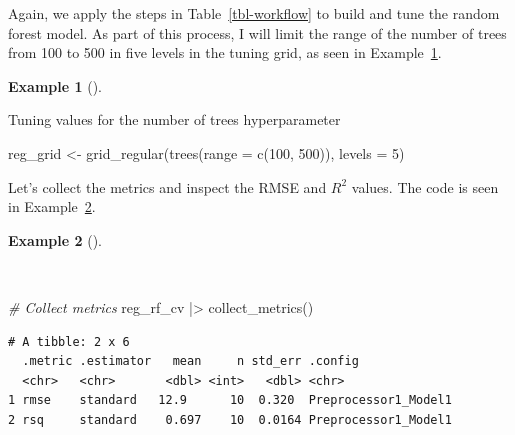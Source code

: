 \documentclass[
  letterpaper,
  krantz1]{latex/krantz-mod}
\newenvironment{Shaded}{\begin{snugshade}}{\end{snugshade}}
\newcommand{\AttributeTok}[1]{\textcolor[rgb]{0.00,0.00,0.00}{#1}}
\newcommand{\CommentTok}[1]{\textcolor[rgb]{0.00,0.00,0.00}{\textit{#1}}}
\newcommand{\DecValTok}[1]{\textcolor[rgb]{0.00,0.00,0.00}{#1}}
\newcommand{\FunctionTok}[1]{\textcolor[rgb]{0.00,0.00,0.00}{#1}}
\newcommand{\NormalTok}[1]{\textcolor[rgb]{0.00,0.00,0.00}{#1}}
\newcommand{\OtherTok}[1]{\textcolor[rgb]{0.00,0.00,0.00}{#1}}
\newcommand{\SpecialCharTok}[1]{\textcolor[rgb]{0.00,0.00,0.00}{#1}}
\theoremstyle{definition}
\newtheorem{example}{Example}[chapter]
\theoremstyle{definition}
\theoremstyle{remark}
\begin{document}
Again, we apply the steps in Table~\ref{tbl-workflow} to build and tune
the random forest model. As part of this process, I will limit the range
of the number of trees from 100 to 500 in five levels in the tuning
grid, as seen in Example~\ref{exm-predict-reg-random-forest-trees}.

\begin{example}[]\protect\hypertarget{exm-predict-reg-random-forest-trees}{}\label{exm-predict-reg-random-forest-trees}

Tuning values for the number of trees hyperparameter

\begin{Shaded}
\begin{Highlighting}[numbers=left,,]
\NormalTok{reg\_grid }\OtherTok{\textless{}{-}}
  \FunctionTok{grid\_regular}\NormalTok{(}\FunctionTok{trees}\NormalTok{(}\AttributeTok{range =} \FunctionTok{c}\NormalTok{(}\DecValTok{100}\NormalTok{, }\DecValTok{500}\NormalTok{)), }\AttributeTok{levels =} \DecValTok{5}\NormalTok{)}
\end{Highlighting}
\end{Shaded}

\end{example}

Let's collect the metrics and inspect the RMSE and \(R^2\) values. The
code is seen in Example~\ref{exm-predict-reg-metrics-rf}.

\begin{example}[]\protect\hypertarget{exm-predict-reg-metrics-rf}{}\label{exm-predict-reg-metrics-rf}

~

\begin{Shaded}
\begin{Highlighting}[numbers=left,,]
\CommentTok{\# Collect metrics}
\NormalTok{reg\_rf\_cv }\SpecialCharTok{|\textgreater{}} \FunctionTok{collect\_metrics}\NormalTok{()}
\end{Highlighting}
\end{Shaded}

\begin{verbatim}
# A tibble: 2 x 6
  .metric .estimator   mean     n std_err .config             
  <chr>   <chr>       <dbl> <int>   <dbl> <chr>               
1 rmse    standard   12.9      10  0.320  Preprocessor1_Model1
2 rsq     standard    0.697    10  0.0164 Preprocessor1_Model1
\end{verbatim}

\end{example}
\end{document}
